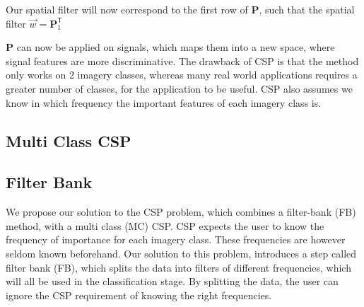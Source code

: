 Our spatial filter will now correspond to the first row of $\pmb{P}$, such that the spatial filter $\vec{w} = \pmb{P}^\mathsf{T}_{1}$ 

$\pmb{P}$ can now be applied  on signals, which maps them into a new space, where signal features are more discriminative. The drawback of CSP is that the method only works on 2 imagery classes, whereas many real world applications requires a greater number of classes, for the application to be useful. CSP also assumes we know in which frequency the important features of each imagery class is.

\subsection{Multi Class CSP}

\subsection{Filter Bank}
We propose our solution to the CSP problem, which combines a filter-bank (FB) method, with a multi class (MC) CSP. CSP expects the user to know the frequency of importance for each imagery class. These frequencies are however seldom known beforehand. Our solution to this problem, introduces a step called filter bank (FB), which splits the data into filters of different frequencies, which will all be used in the classification stage. By splitting the data, the user can ignore the CSP requirement of knowing the right frequencies.

